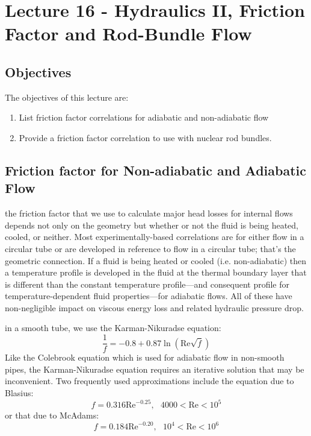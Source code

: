 \chapter{Lecture 16 - Hydraulics II, Friction Factor and Rod-Bundle Flow}
\label{ch:ch16}
\section{Objectives}
The objectives of this lecture are:
\begin{enumerate}
\item List friction factor correlations for adiabatic and non-adiabatic flow
\item Provide a friction factor correlation to use with nuclear rod bundles.
\end{enumerate}


\section{Friction factor for Non-adiabatic and Adiabatic Flow}
 the friction factor that we use to calculate major head losses for internal flows depends not only on the geometry but whether or not the fluid is being heated, cooled, or neither.  Most experimentally-based correlations are for either flow in a circular tube or are developed in reference to flow in a circular tube; that's the geometric connection.  If a fluid is being heated or cooled (i.e. non-adiabatic) then a temperature profile is developed in the fluid at the thermal boundary layer that is different than the constant temperature profile---and consequent profile for temperature-dependent fluid properties---for adiabatic flows.  All of these have non-negligible impact on viscous energy loss and related hydraulic pressure drop.

 in a smooth tube, we use the Karman-Nikuradse equation:
$$\frac{1}{f}=-0.8 + 0.87 \ln{(\text{Re}\sqrt{f})}$$
Like the Colebrook equation which is used for adiabatic flow in non-smooth pipes, the Karman-Nikuradse equation requires an iterative solution that may be inconvenient.  Two frequently used approximations include the equation due to Blasius:
$$ f = 0.316 \text{Re}^{-0.25}, \ \ \ 4000 < \text{Re} < 10^5 $$ 
or that due to McAdams:
$$f = 0.184 \text{Re}^{-0.20}, \ \ \ 10^4  <  \text{Re}  <  10^6$$ 

